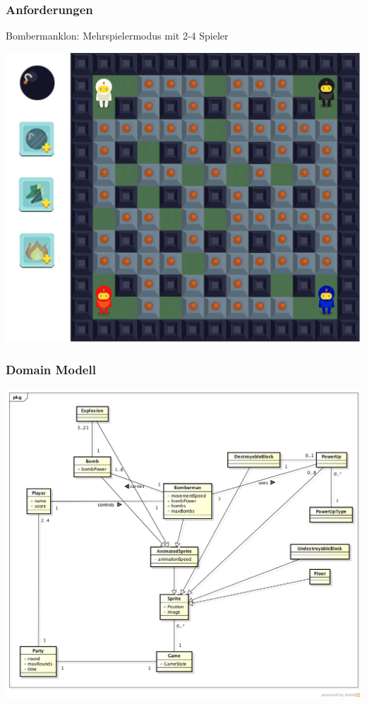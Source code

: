 \documentclass[10pt, compress]{beamer}
\begin{document}
\begin{frame}[fragile]
	\frametitle{Anforderungen}
	Bombermanklon: Mehrspielermodus mit 2-4 Spieler
	\begin{center}
	\includegraphics[scale=0.8]{bombermangame}
	\end{center}
\end{frame}

\begin{frame}[fragile]
  \frametitle{Domain Modell}
	\begin{center}
	\includegraphics[scale=0.25]{Strukturdiagramm_JBomberman}
	\end{center}
\end{frame}
\end{document}
